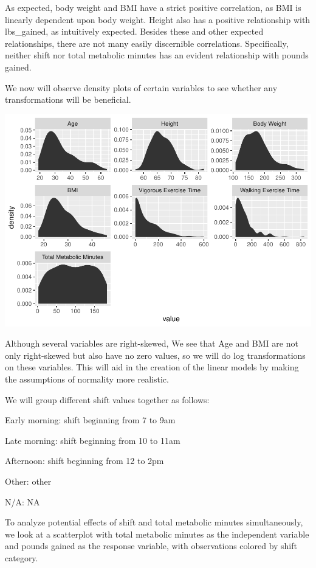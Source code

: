 \documentclass[]{article}
\begin{document}
As expected, body weight and BMI have a strict positive correlation, as
BMI is linearly dependent upon body weight. Height also has a positive
relationship with lbs\_gained, as intuitively expected. Besides these
and other expected relationships, there are not many easily discernible
correlations. Specifically, neither shift nor total metabolic minutes
has an evident relationship with pounds gained.

We now will observe density plots of certain variables to see whether
any transformations will be beneficial.

\includegraphics{Practicum-1-Technical-Report_v2_files/figure-latex/unnamed-chunk-2-1.pdf}

Although several variables are right-skewed, We see that Age and BMI are
not only right-skewed but also have no zero values, so we will do log
transformations on these variables. This will aid in the creation of the
linear models by making the assumptions of normality more realistic.

We will group different shift values together as follows:

Early morning: shift beginning from 7 to 9am

Late morning: shift beginning from 10 to 11am

Afternoon: shift beginning from 12 to 2pm

Other: other

N/A: NA

To analyze potential effects of shift and total metabolic minutes
simultaneously, we look at a scatterplot with total metabolic minutes as
the independent variable and pounds gained as the response variable,
with observations colored by shift category.
\end{document}
